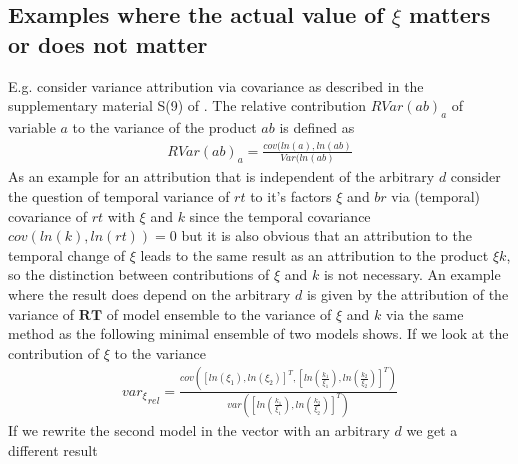\documentclass[journal abbreviation, manuscript]{copernicus}
\theoremstyle{definition}
\newcommand{\RT}{\mathbf{RT}}
\begin{document}
\subsection{Examples where the actual value of $\xi$ matters or does not matter}     %
\label{xi_examples}
E.g. consider variance attribution via covariance as described in the supplementary material S(9) of \citep{Zhou2018JOC}.
The relative contribution $RVar(a b)_a$ of variable $a$ to the variance of the product $a b$ is defined as 
\begin{align}
  \label{covln}
  RVar(a b)_a = \frac{cov(ln(a),ln(a b)}{Var(ln(a b)} 
\end{align}
As an example for an attribution that is independent of the arbitrary $d$
consider the question of temporal variance of $rt$ to it's factors $\xi$ and
$br$ via (temporal) covariance of $rt$ with $\xi$ and $k$ since the temporal
covariance $ cov(ln(k),ln(rt))=0 $ but it is also obvious that an attribution to
the temporal change of $\xi$ leads to the same result as an attribution to the
product $\xi k$, so the distinction between contributions of $\xi$ and $k$ is
not necessary.  
An example where the result does
depend on the arbitrary $d$ is given by the attribution of the variance of $\RT$
of model ensemble to the variance of $\xi$ and $k$ via the same method as the
following minimal ensemble of two models shows. If we look at the contribution
of $\xi$ to the variance
\begin{align}
{var_{\xi}}_{rel} = \frac{
  cov([ln(\xi_1),ln(\xi_2)]^T,[ln(\frac{k_1}{\xi_1}),ln(\frac{k_2}{\xi_2})]^T)
}{
  var([ln(\frac{k_1}{\xi_1}),ln(\frac{k_2}{\xi_2})]^T)
}
\end{align}
If we rewrite the second model in the vector with an arbitrary $d$ we get a different result



\noappendix       %

\end{document}
